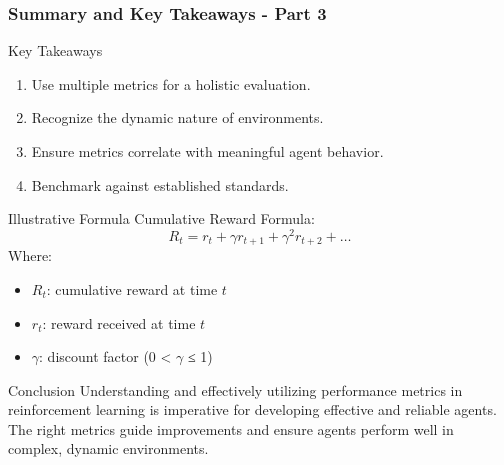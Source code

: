 \documentclass[aspectratio=169]{beamer}
\begin{document}
\begin{frame}[fragile]
    \frametitle{Summary and Key Takeaways - Part 3}
    \begin{block}{Key Takeaways}
        \begin{enumerate}
            \item Use multiple metrics for a holistic evaluation.
            \item Recognize the dynamic nature of environments.
            \item Ensure metrics correlate with meaningful agent behavior.
            \item Benchmark against established standards.
        \end{enumerate}
    \end{block}

    \begin{block}{Illustrative Formula}
        Cumulative Reward Formula:
        \begin{equation}
            R_t = r_t + \gamma r_{t+1} + \gamma^2 r_{t+2} + \ldots
        \end{equation}
        Where:
        \begin{itemize}
            \item \( R_t \): cumulative reward at time \( t \)
            \item \( r_t \): reward received at time \( t \)
            \item \( \gamma \): discount factor (0 < \( \gamma \) ≤ 1)
        \end{itemize}
    \end{block}
\end{frame}

\begin{frame}{Conclusion}
    Understanding and effectively utilizing performance metrics in reinforcement learning is imperative for developing effective and reliable agents. The right metrics guide improvements and ensure agents perform well in complex, dynamic environments.
\end{frame}
\end{document}
